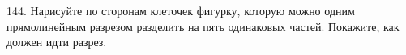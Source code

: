 144. Нарисуйте по сторонам клеточек фигурку, которую можно одним прямолинейным разрезом разделить на пять одинаковых частей. Покажите, как должен идти разрез.\\
